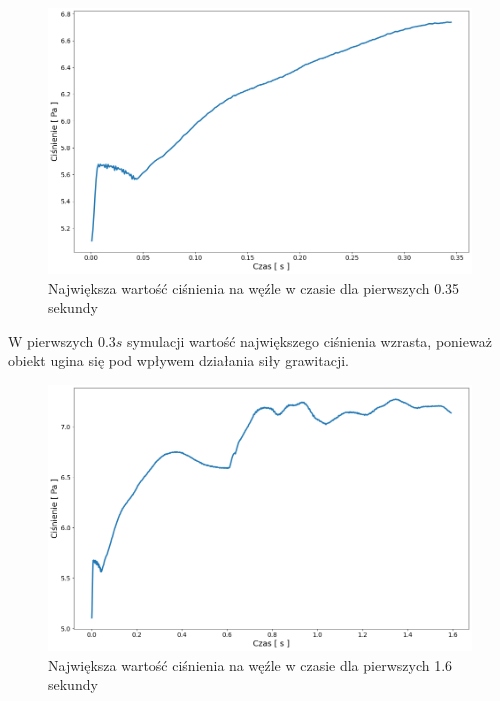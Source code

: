 \documentclass[12pt, letterpaper]{report}
\begin{document}
    \begin{figure}[H]
        \centering
        \includegraphics[width=16cm]{pressure_pressure02_01}
        \caption{
            Największa wartość ciśnienia na węźle w czasie dla pierwszych 0.35 sekundy
        }
    \end{figure}

    W pierwszych $0.3s$ symulacji wartość największego ciśnienia wzrasta, ponieważ obiekt
    ugina się pod wpływem działania siły grawitacji.

    \clearpage
    \begin{figure}[H]
        \centering
        \includegraphics[width=16cm]{pressure_pressure02_02}
        \caption{
            Największa wartość ciśnienia na węźle w czasie dla pierwszych 1.6 sekundy
        }
    \end{figure}
\end{document}
